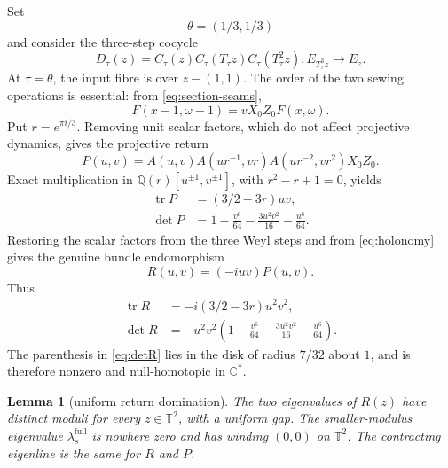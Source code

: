 \documentclass[11pt]{amsart}
\newtheorem{lemma}[theorem]{Lemma}
\theoremstyle{remark}
\newcommand{\C}{\mathbb C}
\newcommand{\Q}{\mathbb Q}
\newcommand{\T}{\mathbb T}
\newcommand{\tr}{\operatorname{tr}}
\begin{document}
Set
\[
 \theta=(1/3,1/3)
\]
and consider the three-step cocycle
\begin{equation}\label{eq:Dtau}
 D_\tau(z)=C_\tau(z)C_\tau(T_\tau z)C_\tau(T_\tau^2z):
 E_{T_\tau^3z}\longrightarrow E_z.
\end{equation}
At $\tau=\theta$, the input fibre is over $z-(1,1)$.  The order of the two
sewing operations is essential: from \eqref{eq:section-seams},
\begin{equation}\label{eq:holonomy}
 F(x-1,\omega-1)=vX_0Z_0F(x,\omega).
\end{equation}
Put $r=e^{\pi i/3}$.  Removing unit scalar factors, which do not affect
projective dynamics, gives the projective return
\begin{equation}\label{eq:P}
 P(u,v)=A(u,v)A(ur^{-1},vr)A(ur^{-2},vr^2)X_0Z_0.
\end{equation}
Exact multiplication in
$\Q(r)[u^{\pm1},v^{\pm1}]$, with $r^2-r+1=0$, yields
\begin{align}
 \tr P&=(3/2-3r)uv,                                      \label{eq:trP}\\
 \det P&=1-\frac{v^6}{64}-\frac{3u^2v^2}{16}-\frac{u^6}{64}.
                                                               \label{eq:detP}
\end{align}
Restoring the scalar factors from the three Weyl steps and from
\eqref{eq:holonomy} gives the genuine bundle endomorphism
\begin{equation}\label{eq:R}
 R(u,v)=(-iuv)P(u,v).
\end{equation}
Thus
\begin{align}
 \tr R&=-i(3/2-3r)u^2v^2,                                 \label{eq:trR}\\
 \det R&=-u^2v^2
 \left(1-\frac{v^6}{64}-\frac{3u^2v^2}{16}-\frac{u^6}{64}\right).
                                                               \label{eq:detR}
\end{align}
The parenthesis in \eqref{eq:detR} lies in the disk of radius $7/32$ about
$1$, and is therefore nonzero and null-homotopic in $\C^*$.

\begin{lemma}[uniform return domination]\label{lem:domination}
The two eigenvalues of $R(z)$ have distinct moduli for every $z\in\T^2$, with
a uniform gap.  The smaller-modulus eigenvalue
$\lambda_s^{\mathrm{full}}$ is nowhere zero and has winding $(0,0)$ on
$\T^2$.  The contracting eigenline is the same for $R$ and $P$.
\end{lemma}
\end{document}
